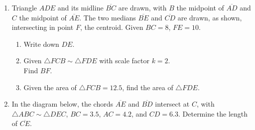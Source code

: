 \documentclass[12pt, twoside]{article}
\begin{document}
\begin{enumerate}
\item Triangle $ADE$ and its midline $\overline{BC}$ are drawn, with $B$ the midpoint of $\overline{AD}$ and $C$ the midpoint of $\overline{AE}$. The two medians $\overline{BE}$ and $\overline{CD}$ are drawn, as shown, intersecting in point $F$, the centroid. Given $BC=8$, $FE=10$.
\begin{multicols}{2}
  \begin{enumerate}[itemsep=1.5cm]
    \item Write down $DE$.
    \item Given $\triangle FCB \sim \triangle FDE$ with scale factor $k=2$. \\[0.5cm]
     Find $BF$.
     \item Given the area of $\triangle FCB = 12.5$, find the area of $\triangle FDE$.
  \end{enumerate}
  \begin{center}
  \end{center}
\end{multicols}
 \vspace{1cm}

\newpage
\item In the diagram below, the chords $\overline{AE}$ and $\overline{BD}$ intersect at $C$, with $\triangle ABC \sim \triangle DEC$, $BC=3.5$, $AC=4.2$, and $CD=6.3$. Determine the length of $\overline{CE}$.
    \begin{center}
  \end{center} \vspace{2cm}


\end{enumerate}
\end{document}
